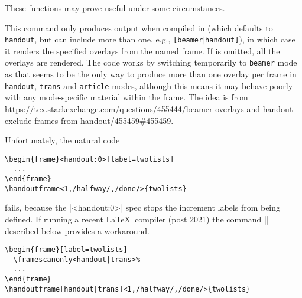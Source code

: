 \documentclass[a4paper]{ltxdoc}
\begin{document}
These functions may prove useful under some circumstances.

\begin{command}{\handoutframe{}}
  This command only produces output when compiled in  (which
  defaults to \texttt{handout}, but can include more than one, e.g.,
  \texttt{[beamer$\mid$handout]}), in which case it renders the specified
  overlays from the named frame.  If  is omitted,
  all the overlays are rendered.  The code works by switching temporarily to
  \texttt{beamer} mode as that seems to be the only way to produce more than one
  overlay per frame in \texttt{handout}, \texttt{trans} and \texttt{article}
  modes, although this means it may behave poorly with any mode-specific
  material within the frame.  The idea is from
  \url{https://tex.stackexchange.com/questions/455444/beamer-overlays-and-handout-exclude-frames-from-handout/455459#455459}.
\end{command}

Unfortunately,  the natural code
\example
\begin{verbatim}
\begin{frame}<handout:0>[label=twolists]
  ...
\end{frame}
\handoutframe<1,/halfway/,/done/>{twolists}
\end{verbatim}
fails, because the |<handout:0>| spec stops the increment labels from being
defined.  If running a recent \LaTeX\ compiler (post 2021) the command
|| described below provides a workaround.
\example
\begin{verbatim}
\begin{frame}[label=twolists]
  \framescanonly<handout|trans>%
  ...
\end{frame}
\handoutframe[handout|trans]<1,/halfway/,/done/>{twolists}
\end{verbatim}


\end{document}
